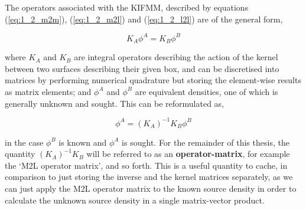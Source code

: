 The operators associated with the \gls{KIFMM}, described by equations
(\ref{eq:1_2_m2m}), (\ref{eq:1_2_m2l}) and (\ref{eq:1_2_l2l}) are of the general
form,

\begin{equation}
    K_A\phi^A = K_B\phi^B
\end{equation}

where $K_A$ and $K_B$ are integral operators describing the action of the kernel
between two surfaces describing their given box, and can be discretised into
matrices by performing numerical quadrature but storing the element-wise results
as matrix elements; and $\phi^A$ and $\phi^B$ are equivalent densities, one of
which is generally unknown and sought. This can be reformulated as,

\begin{equation}
    \phi^A = (K_A)^{-1}K_B\phi^B
    \label{eq:2_3_general_operator}
\end{equation}

in the case $\phi^B$ is known and $\phi^A$ is sought. For the remainder of this
thesis, the quantity $(K_A)^{-1}K_B$ will be referred to as an \textbf{\gls{operator-matrix}},
for example the `M2L operator matrix', and so forth. This is a useful quantity
to cache, in comparison to just storing the inverse and the kernel matrices separately,
as we can just apply the M2L operator matrix to the known source density in order
to calculate the unknown source density in a single matrix-vector product.

